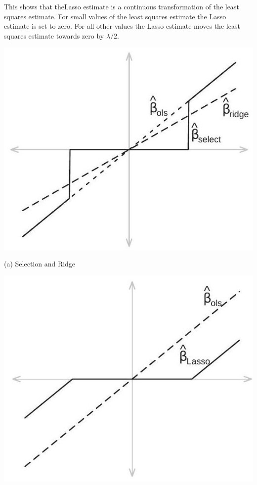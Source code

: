 \documentclass[10pt]{article}
\begin{document}
This shows that theLasso estimate is a continuous transformation of the least squares estimate. For small values of the least squares estimate the Lasso estimate is set to zero. For all other values the Lasso estimate moves the least squares estimate towards zero by $\lambda / 2$.

\begin{center}
\includegraphics[max width=\textwidth]{2022_11_27_70699ac9776c9435969dg-11}
\end{center}

(a) Selection and Ridge

\begin{center}
\includegraphics[max width=\textwidth]{2022_11_27_70699ac9776c9435969dg-11(1)}
\end{center}
\end{document}

